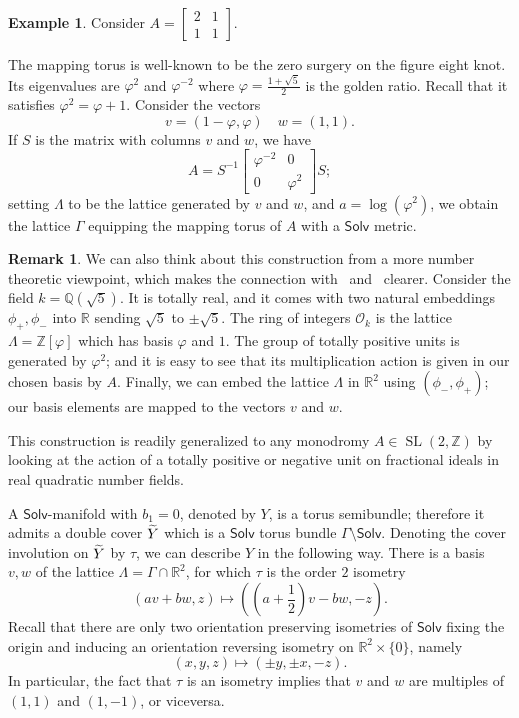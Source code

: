 \documentclass[11pt]{article}
\theoremstyle{definition}
\newtheorem{exam}[theo]{Example}
\newtheorem{rema}[theo]{Remark}
\numberwithin{equation}{section}
\numberwithin{figure}{section}
\numberwithin{table}{section}
\newcommand{\Solv}{\mathsf{Solv}}
\DeclareMathOperator{\SL}{SL}
\let\oldtilde\tilde
\renewcommand*{\tilde}[1]{\mathchoice{\widetilde{#1}}{\widetilde{#1}}{\oldtilde{#1}}{\oldtilde{#1}}}\let\oldhat\hat
\renewcommand*{\hat}[1]{\mathchoice{\widehat{#1}}{\widehat{#1}}{\oldhat{#1}}{\oldhat{#1}}}
\begin{document}
\begin{exam}\label{figure8}
Consider $ A=
\begin{bmatrix}2&1\\1 &1
\end{bmatrix}.$

The mapping torus is well-known to be the zero surgery on the figure eight knot. Its eigenvalues are $\varphi^2$ and $\varphi^{-2}$ where $\varphi=\frac{1+\sqrt{5}}{2}$ is the golden ratio. Recall that it satisfies $\varphi^2=\varphi+1$. Consider the vectors
\[
v=(1-\varphi,\varphi)\quad w=(1,1).
\]
If $S$ is the matrix with columns $v$ and $w$, we have
\[
A=S^{-1}
\begin{bmatrix}\varphi^{-2}&0\\0 &\varphi^{2}
\end{bmatrix}S;
\]
setting $\Lambda$ to be the lattice generated by $v$ and $w$, and $a=\log(\varphi^2)$, we obtain the lattice $\Gamma$ equipping the mapping torus of $A$ with a $\Solv$ metric.
\end{exam}

\begin{rema}\label{NT}
We can also think about this construction from a more number theoretic viewpoint, which makes the connection with~\cite{Hir} and~\cite{ADS} clearer. Consider the field $k=\mathbb{Q}(\sqrt{5})$. It is totally real, and it comes with two natural embeddings $\phi_+,\phi_-$ into $\mathbb{R}$ sending $\sqrt{5}$ to $\pm\sqrt{5}$. The ring of integers $\mathcal{O}_k$ is the lattice $\Lambda=\mathbb{Z}[\varphi]$ which has basis $\varphi$ and $1$. The group of totally positive units is generated by $\varphi^2$; and it is easy to see that its multiplication action is given in our chosen basis by $A$. Finally, we can embed the lattice $\Lambda$ in $\mathbb{R}^2$ using $(\phi_-,\phi_+)$; our basis elements are mapped to the vectors $v$ and $w$.


This construction is readily generalized to any monodromy $A\in \SL(2,\mathbb{Z})$ by looking at the action of a totally positive or negative unit on fractional ideals in real quadratic number fields.
\end{rema}

A $\Solv$-manifold with $b_1=0$, denoted by $Y$, is a torus semibundle; therefore it admits a double cover $\tilde{Y}$ which is a $\Solv$ torus bundle $\Gamma\setminus\Solv$. Denoting the cover involution on $\tilde{Y}$ by $\tau$, we can describe $Y$ in the following way. There is a basis $v,w$ of the lattice $\Lambda=\Gamma\cap \mathbb{R}^2$, for which $\tau$ is the order $2$ isometry
\[
(av+bw,z)\mapsto \left(\left(a+\frac{1}{2}\right)v-bw,-z\right).
\]
Recall that there are only two orientation preserving isometries of $\Solv$ fixing the origin and inducing an orientation reversing isometry on $\mathbb{R}^2\times \{0\}$, namely
\[
(x,y,z)\mapsto (\pm y, \pm x, -z).
\]
In particular, the fact that $\tau$ is an isometry implies that $v$ and $w$ are multiples of $(1,1)$ and $(1,-1)$, or viceversa.
\end{document}
